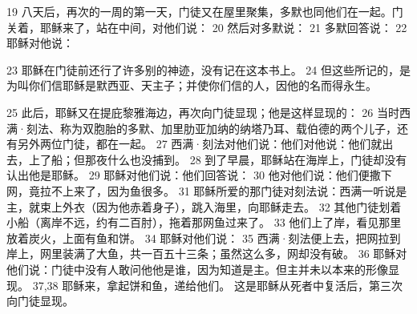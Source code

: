 19 八天后，再次的一周的第一天，门徒又在屋里聚集，多默也同他们在一起。门关着，耶稣来了，站在中间，对他们说： 20 然后对多默说： 21 多默回答说： 22 耶稣对他说：\par

23 耶稣在门徒前还行了许多别的神迹，没有记在这本书上。 24 但这些所记的，是为叫你们信耶稣是默西亚、天主子；并使你们信的人，因他的名而得永生。\par

25 此后，耶稣又在提庇黎雅海边，再次向门徒显现；他是这样显现的： 26 当时西满·刻法、称为双胞胎的多默、加里肋亚加纳的纳塔乃耳、载伯德的两个儿子，还有另外两位门徒，都在一起。 27 西满·刻法对他们说：他们对他说：他们就出去，上了船；但那夜什么也没捕到。 28 到了早晨，耶稣站在海岸上，门徒却没有认出他是耶稣。 29 耶稣对他们说：他们回答说： 30 他对他们说：他们便撒下网，竟拉不上来了，因为鱼很多。 31 耶稣所爱的那门徒对刻法说：西满一听说是主，就束上外衣（因为他赤着身子），跳入海里，向耶稣走去。 32 其他门徒划着小船（离岸不远，约有二百肘），拖着那网鱼过来了。 33 他们上了岸，看见那里放着炭火，上面有鱼和饼。 34 耶稣对他们说： 35 西满·刻法便上去，把网拉到岸上，网里装满了大鱼，共一百五十三条；虽然这么多，网却没有破。 36 耶稣对他们说：门徒中没有人敢问他他是谁，因为知道是主。但主并未以本来的形像显现。 37,38 耶稣来，拿起饼和鱼，递给他们。 这是耶稣从死者中复活后，第三次向门徒显现。\par


